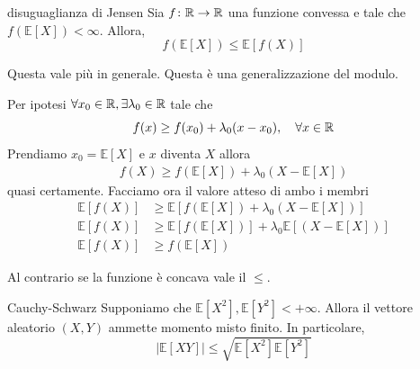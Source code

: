 \documentclass[a4paper]{article}
\begin{document}
\begin{snippetproposition}{disuguaglianza di Jensen}
    Sia \(f \colon \mathbb{R} \to \mathbb{R}\) una funzione convessa e tale che
    \(f(\mathbb E[X]) < \infty\). Allora,
    \[
        f(\mathbb E[X]) \leq \mathbb E[f(X)]
    \]
\end{snippetproposition}

Questa vale più in generale.
Questa è una generalizzazione del modulo.

\begin{snippetproof}{}
    Per ipotesi \(\forall x_0 \in \mathbb{R}, \exists \lambda_0 \in \mathbb{R}\)
    tale che \[
        f(x) \geq f(x_0) + \lambda_0(x-x_0), \quad \forall x \in \mathbb{R}
    \]
    Prendiamo \(x_0 = \mathbb E[X]\) e \(x\) diventa \(X\) allora
    \begin{align*}
        f(X) \geq f(\mathbb E[X]) + \lambda_0(X- \mathbb E[X])
    \end{align*}
    quasi certamente. Facciamo ora il valore atteso di ambo i membri
    \begin{align*}
        \mathbb E[f(X)] &\geq \mathbb E\left[f(\mathbb E[X]) + \lambda_0(X- \mathbb E[X])\right] \\
        \mathbb E[f(X)] &\geq \mathbb E[f(\mathbb E[X])] +  \lambda_0 \mathbb E[(X- \mathbb E[X])] \\
        \mathbb E[f(X)] &\geq f(\mathbb E[X])
    \end{align*}
\end{snippetproof}

Al contrario se la funzione è concava vale il \(\leq\).

\begin{snippetproposition}{Cauchy-Schwarz}
    Supponiamo che \(\mathbb E[X^2], \mathbb E[Y^2] < +\infty\).
    Allora il vettore aleatorio \((X,Y)\) ammette momento misto finito.
    In particolare,
    \[
        |\mathbb E[XY]| \leq \sqrt{\mathbb E[X^2] \mathbb E[Y^2]}
    \]
\end{snippetproposition}
\end{document}
